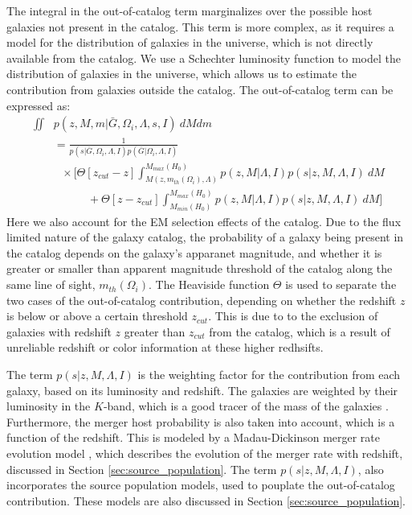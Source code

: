 The integral in the out-of-catalog term marginalizes over the possible host galaxies not present in the catalog. This term is more complex, as it requires a model for the distribution of galaxies in the universe, which is not directly available from the catalog. We use a Schechter luminosity function to model the distribution of galaxies in the universe, which allows us to estimate the contribution from galaxies outside the catalog. The out-of-catalog term can be expressed as:
\begin{align}
  \iint & p(z, M, m|\bar{G},\Omega_i, \Lambda, s, I)~dM dm \nonumber \\
  &= \frac{1}{p(s|\bar{G},\Omega_i, \Lambda, I)p(\bar{G}|\Omega_i, \Lambda, I)} \nonumber \\ 
  &~~~\times \Bigg[\Theta[z_{cut} -z] \int_{M(z,m_{th}(\Omega_i), \Lambda)}^{M_{max}(H_0)} p(z,M|\Lambda, I) p(s|z,M,\Lambda,I)~dM \nonumber \\
  &\qquad \quad + \Theta[z-z_{cut}] \int_{M_{min}(H_0)}^{M_{max}(H_0)} p(z,M|\Lambda, I) p(s|z,M,\Lambda,I)~dM \Bigg]
\end{align}
Here we also account for the \ac{EM} selection effects of the catalog. Due to the flux limited nature of the galaxy catalog, the probability of a galaxy being present in the catalog depends on the galaxy's apparanet magnitude, and whether it is greater or smaller than apparent magnitude threshold of the catalog along the same line of sight, $m_{th}(\Omega_i)$. The Heaviside function $\Theta$ is used to separate the two cases of the out-of-catalog contribution, depending on whether the redshift $z$ is below or above a certain threshold $z_{cut}$. This is due to to the exclusion of galaxies with redshift $z$ greater than $z_{cut}$ from the catalog, which is a result of unreliable redshift or color information at these higher redhsifts. 

The term $p(s|z,M,\Lambda,I)$ is the weighting factor for the contribution from each galaxy, based on its luminosity and redshift. The galaxies are weighted by their luminosity in the $K$-band, which is a good tracer of the mass of the galaxies \citep{strazzullo2006near,sureshkumar2021galaxy}. Furthermore, the merger host probability is also taken into account, which is a function of the redshift. This is modeled by a Madau-Dickinson merger rate evolution model \citep{madau2014cosmic}, which describes the evolution of the merger rate with redshift, discussed in Section \ref{sec:source_population}. The term $p(s|z,M,\Lambda,I)$, also incorporates the source population models, used to pouplate the out-of-catalog contribution. These models are also discussed in Section \ref{sec:source_population}.

